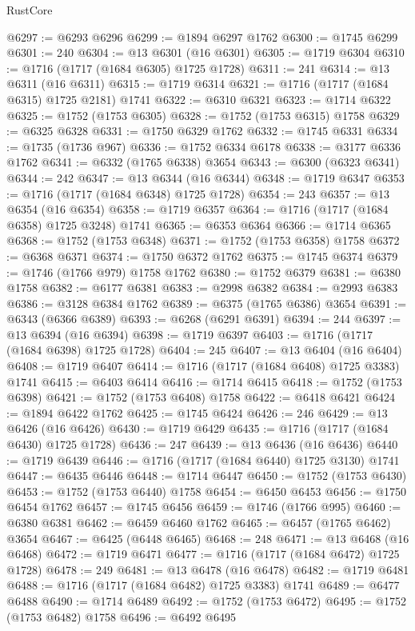\begin{lexlean}{RustCore}
\begin{coremodule}
@6297 := @6293 @6296
@6299 := @1894 @6297 @1762
@6300 := @1745 @6299
@6301 := 240
@6304 := @13 @6301 (@16 @6301)
@6305 := @1719 @6304
@6310 := @1716 (@1717 (@1684 @6305) @1725 @1728)
@6311 := 241
@6314 := @13 @6311 (@16 @6311)
@6315 := @1719 @6314
@6321 := @1716 (@1717 (@1684 @6315) @1725 @2181) @1741
@6322 := @6310 @6321
@6323 := @1714 @6322
@6325 := @1752 (@1753 @6305)
@6328 := @1752 (@1753 @6315) @1758
@6329 := @6325 @6328
@6331 := @1750 @6329 @1762
@6332 := @1745 @6331
@6334 := @1735 (@1736 @967)
@6336 := @1752 @6334 @6178
@6338 := @3177 @6336 @1762
@6341 := @6332 (@1765 @6338) @3654
@6343 := @6300 (@6323 @6341)
@6344 := 242
@6347 := @13 @6344 (@16 @6344)
@6348 := @1719 @6347
@6353 := @1716 (@1717 (@1684 @6348) @1725 @1728)
@6354 := 243
@6357 := @13 @6354 (@16 @6354)
@6358 := @1719 @6357
@6364 := @1716 (@1717 (@1684 @6358) @1725 @3248) @1741
@6365 := @6353 @6364
@6366 := @1714 @6365
@6368 := @1752 (@1753 @6348)
@6371 := @1752 (@1753 @6358) @1758
@6372 := @6368 @6371
@6374 := @1750 @6372 @1762
@6375 := @1745 @6374
@6379 := @1746 (@1766 @979) @1758 @1762
@6380 := @1752 @6379
@6381 := @6380 @1758
@6382 := @6177 @6381
@6383 := @2998 @6382
@6384 := @2993 @6383
@6386 := @3128 @6384 @1762
@6389 := @6375 (@1765 @6386) @3654
@6391 := @6343 (@6366 @6389)
@6393 := @6268 (@6291 @6391)
@6394 := 244
@6397 := @13 @6394 (@16 @6394)
@6398 := @1719 @6397
@6403 := @1716 (@1717 (@1684 @6398) @1725 @1728)
@6404 := 245
@6407 := @13 @6404 (@16 @6404)
@6408 := @1719 @6407
@6414 := @1716 (@1717 (@1684 @6408) @1725 @3383) @1741
@6415 := @6403 @6414
@6416 := @1714 @6415
@6418 := @1752 (@1753 @6398)
@6421 := @1752 (@1753 @6408) @1758
@6422 := @6418 @6421
@6424 := @1894 @6422 @1762
@6425 := @1745 @6424
@6426 := 246
@6429 := @13 @6426 (@16 @6426)
@6430 := @1719 @6429
@6435 := @1716 (@1717 (@1684 @6430) @1725 @1728)
@6436 := 247
@6439 := @13 @6436 (@16 @6436)
@6440 := @1719 @6439
@6446 := @1716 (@1717 (@1684 @6440) @1725 @3130) @1741
@6447 := @6435 @6446
@6448 := @1714 @6447
@6450 := @1752 (@1753 @6430)
@6453 := @1752 (@1753 @6440) @1758
@6454 := @6450 @6453
@6456 := @1750 @6454 @1762
@6457 := @1745 @6456
@6459 := @1746 (@1766 @995)
@6460 := @6380 @6381
@6462 := @6459 @6460 @1762
@6465 := @6457 (@1765 @6462) @3654
@6467 := @6425 (@6448 @6465)
@6468 := 248
@6471 := @13 @6468 (@16 @6468)
@6472 := @1719 @6471
@6477 := @1716 (@1717 (@1684 @6472) @1725 @1728)
@6478 := 249
@6481 := @13 @6478 (@16 @6478)
@6482 := @1719 @6481
@6488 := @1716 (@1717 (@1684 @6482) @1725 @3383) @1741
@6489 := @6477 @6488
@6490 := @1714 @6489
@6492 := @1752 (@1753 @6472)
@6495 := @1752 (@1753 @6482) @1758
@6496 := @6492 @6495

\end{coremodule}
\end{lexlean}
